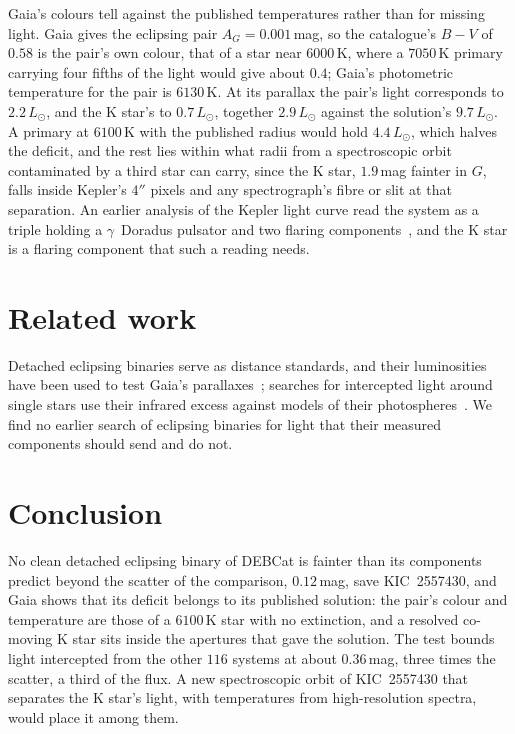 \documentclass[3p,11pt]{elsarticle}
\begin{document}
Gaia's colours tell against the published temperatures rather than for missing light.
Gaia gives the eclipsing pair $A_G=0.001$\,mag, so the catalogue's $B-V$ of $0.58$ is
the pair's own colour, that of a star near $6000$\,K, where a $7050$\,K primary carrying
four fifths of the light would give about $0.4$; Gaia's photometric temperature for the
pair is $6130$\,K. At its parallax the pair's light corresponds to $2.2\,L_\odot$, and
the K star's to $0.7\,L_\odot$, together $2.9\,L_\odot$ against the solution's
$9.7\,L_\odot$. A primary at $6100$\,K with the published radius would hold $4.4\,L_\odot$,
which halves the deficit, and the rest lies within what radii from a spectroscopic orbit
contaminated by a third star can carry, since the K star, $1.9$\,mag fainter in $G$,
falls inside Kepler's $4''$ pixels and any spectrograph's fibre or slit at that
separation. An earlier analysis of the Kepler light curve read the system as a triple
holding a $\gamma$~Doradus pulsator and two flaring components~\cite{Kamil2017}, and the
K star is a flaring component that such a reading needs.

\section{Related work}\label{sec:related}

Detached eclipsing binaries serve as distance standards, and their luminosities have
been used to test Gaia's parallaxes~\cite{Stassun2021}; searches for intercepted light
around single stars use their infrared excess against models of their
photospheres~\cite{Suazo2024}. We find no earlier search of eclipsing binaries for
light that their measured components should send and do not.

\section{Conclusion}\label{sec:conclusion}

No clean detached eclipsing binary of DEBCat is fainter than its components predict
beyond the scatter of the comparison, $0.12$\,mag, save KIC~2557430, and Gaia shows
that its deficit belongs to its published solution: the pair's colour and temperature
are those of a $6100$\,K star with no extinction, and a resolved co-moving K star sits
inside the apertures that gave the solution. The test bounds light intercepted from the
other $116$ systems at about $0.36$\,mag, three times the scatter, a third of the flux.
A new spectroscopic orbit of KIC~2557430 that separates the K star's light, with
temperatures from high-resolution spectra, would place it among them.
\end{document}
